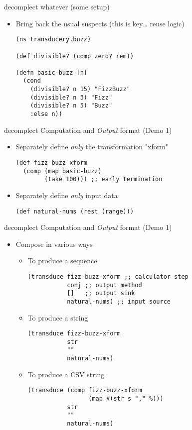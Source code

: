 \documentclass[presentation]{beamer}
\begin{document}
\begin{frame}[label={sec:orgcca840f},fragile]{decomplect whatever (some setup)}
 \begin{itemize}
\item Bring back the usual suspects (this is key\ldots{} reuse logic)
\begin{verbatim}
(ns transducery.buzz)

(def divisible? (comp zero? rem))

(defn basic-buzz [n]
  (cond
    (divisible? n 15) "FizzBuzz"
    (divisible? n 3) "Fizz"
    (divisible? n 5) "Buzz"
    :else n))
\end{verbatim}
\end{itemize}
\end{frame}
\begin{frame}[label={sec:orgcbf7b8e},fragile]{decomplect Computation and \emph{Output} format (Demo 1)}
 \begin{itemize}
\item Separately define \emph{only} the transformation "xform"
\begin{verbatim}
(def fizz-buzz-xform
  (comp (map basic-buzz)
        (take 100))) ;; early termination
\end{verbatim}
\item Separately define \emph{only} input data
\begin{verbatim}
(def natural-nums (rest (range)))
\end{verbatim}
\end{itemize}
\end{frame}
\begin{frame}[label={sec:org41956be},fragile]{decomplect Computation and \emph{Output} format (Demo 1)}
 \begin{itemize}
\item Compose in various ways
\begin{itemize}
\item To produce a sequence
\begin{verbatim}
(transduce fizz-buzz-xform ;; calculator step
           conj ;; output method
           []   ;; output sink
           natural-nums) ;; input source
\end{verbatim}
\item To produce a string
\begin{verbatim}
(transduce fizz-buzz-xform
           str
           ""
           natural-nums)
\end{verbatim}
\item To produce a CSV string
\begin{verbatim}
(transduce (comp fizz-buzz-xform
                 (map #(str s "," %)))
           str
           ""
           natural-nums)
\end{verbatim}
\end{itemize}
\end{itemize}
\end{frame}
\end{document}
